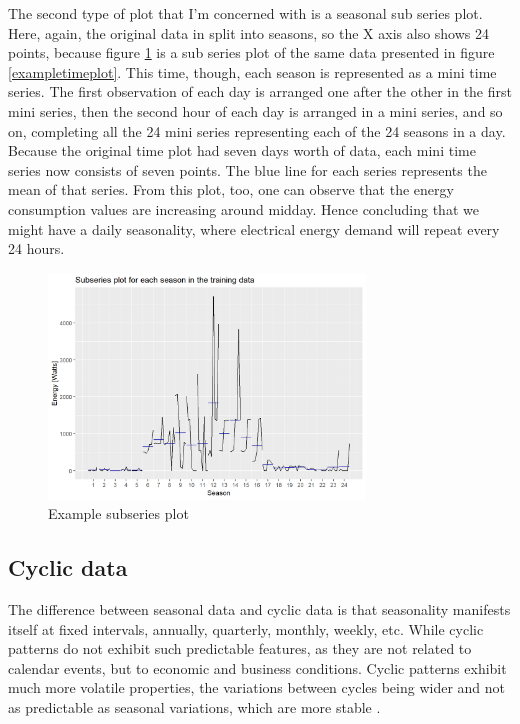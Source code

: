 \documentclass[12pt,a4paper,titlepage]{report}
\begin{document}
The second type of plot that I'm concerned with is a seasonal sub series plot. Here, again, the original data in split into seasons, so the X axis also shows 24 points, because figure \ref{examplesubseriesplot} is a sub series plot of the same data presented in figure \ref{exampletimeplot}.
This time, though, each season is represented as a mini time series. The first observation of each day is arranged one after the other in the first mini series, then the second hour of each day is arranged in a mini series, and so on, completing all the 24 mini series representing each of the 24 seasons in a day. Because the original time plot had seven days worth of data, each mini time series now consists of seven points. The blue line for each series represents the mean of that series. From this plot, too, one can observe that the energy consumption values are increasing around midday. Hence concluding that we might have a daily seasonality, where electrical energy demand will repeat every 24 hours.

\begin{figure}[h]
    \centering
    \includegraphics[width=0.75\textwidth]{d1hrsph1subseriesplot}
    \caption{Example subseries plot}
    \label{examplesubseriesplot}
\end{figure}

\subsection{Cyclic data}
The difference between seasonal data and cyclic data is that seasonality manifests itself at fixed intervals, annually, quarterly, monthly, weekly, etc. While cyclic patterns do not exhibit such predictable features, as they are not related to calendar events, but to economic and business conditions. Cyclic patterns exhibit much more volatile properties, the variations between cycles being wider and not as predictable as seasonal variations, which are more stable \cite{fpp2tspatterns}.
\end{document}

